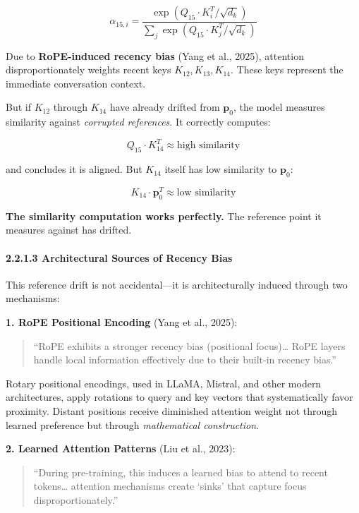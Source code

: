 \[\alpha_{15,i} = \frac{\exp(Q_{15} \cdot K_i^T / \sqrt{d_k})}{\sum_j \exp(Q_{15} \cdot K_j^T / \sqrt{d_k})}\]

Due to \textbf{RoPE-induced recency bias} (Yang et al., 2025), attention
disproportionately weights recent keys \(K_{12}, K_{13}, K_{14}\). These
keys represent the immediate conversation context.

But if \(K_{12}\) through \(K_{14}\) have already drifted from
\(\mathbf{p}_0\), the model measures similarity against \emph{corrupted
references}. It correctly computes:

\[Q_{15} \cdot K_{14}^T \approx \text{high similarity}\]

and concludes it is aligned. But \(K_{14}\) itself has low similarity to
\(\mathbf{p}_0\):

\[K_{14} \cdot \mathbf{p}_0^T \approx \text{low similarity}\]

\textbf{The similarity computation works perfectly.} The reference point
it measures against has drifted.

\paragraph{2.2.1.3 Architectural Sources of Recency
Bias}\label{architectural-sources-of-recency-bias}

This reference drift is not accidental---it is architecturally induced
through two mechanisms:

\textbf{1. RoPE Positional Encoding} (Yang et al., 2025):

\begin{quote}
``RoPE exhibits a stronger recency bias (positional focus)\ldots{} RoPE
layers handle local information effectively due to their built-in
recency bias.''
\end{quote}

Rotary positional encodings, used in LLaMA, Mistral, and other modern
architectures, apply rotations to query and key vectors that
systematically favor proximity. Distant positions receive diminished
attention weight not through learned preference but through
\emph{mathematical construction}.

\textbf{2. Learned Attention Patterns} (Liu et al., 2023):

\begin{quote}
``During pre-training, this induces a learned bias to attend to recent
tokens\ldots{} attention mechanisms create `sinks' that capture focus
disproportionately.''
\end{quote}

